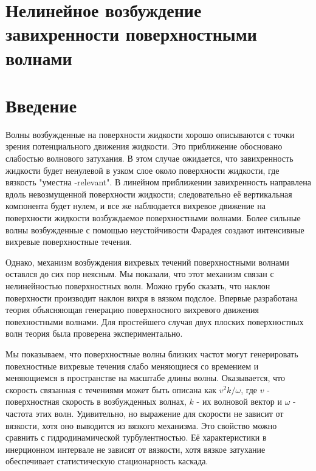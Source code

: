 \section{Нелинейное возбуждение завихренности поверхностными волнами} \label{sect3_3}

\section{Введение} \label{sect3_4}
Волны возбужденные на поверхности жидкости хорошо описываются с точки зрения потенциального движения жидкости. Это приближение обосновано слабостью волнового затухания. В этом случае ожидается, что завихренность жидкости будет ненулевой в узком слое около поверхности жидкости, где вязкость "уместна -relevant". В линейном приближении  завихренность направлена вдоль невозмущенной поверхности жидкости; следовательно её вертикальная компонента будет нулем, и все же наблюдается вихревое движение на поверхности жидкости возбуждаемое поверхностными волнами. Более сильные волны возбужденные с помощью неустойчивости Фарадея создают интенсивные вихревые поверхностные течения.

Однако, механизм возбуждения вихревых течений поверхностными волнами оставлся до сих пор неясным. Мы показали, что этот механизм связан с нелинейностью поверхностных волн. Можно грубо сказать, что наклон поверхности производит наклон вихря в вязком подслое. Впервые разработана теория объясняющая генерацию поверхносного вихревого движения повехностными волнами. Для простейшего случая двух плоских поверхностных волн теория была проверена экспериментально.

Мы показываем, что поверхностные волны близких частот могут генерировать повехностные вихревые течения слабо меняющиеся со времением и меняющиемся в пространстве на масштабе длины волны. Оказывается, что скорость связанная с течениями может быть описана как $v^2k/\omega$, где $v$ - поверхностная скорость в возбужденных волнах, $k$ - их волновой вектор и $\omega$ - частота этих волн. Удивительно, но выражение для скорости не зависит от вязкости, хотя оно выводится из вязкого механизма. Это свойство можно сравнить с гидродинамической турбулентностью. Её характеристики в инерционном интервале не зависят от вязкости, хотя вязкое затухание обеспечивает статистическую стационарность каскада.

